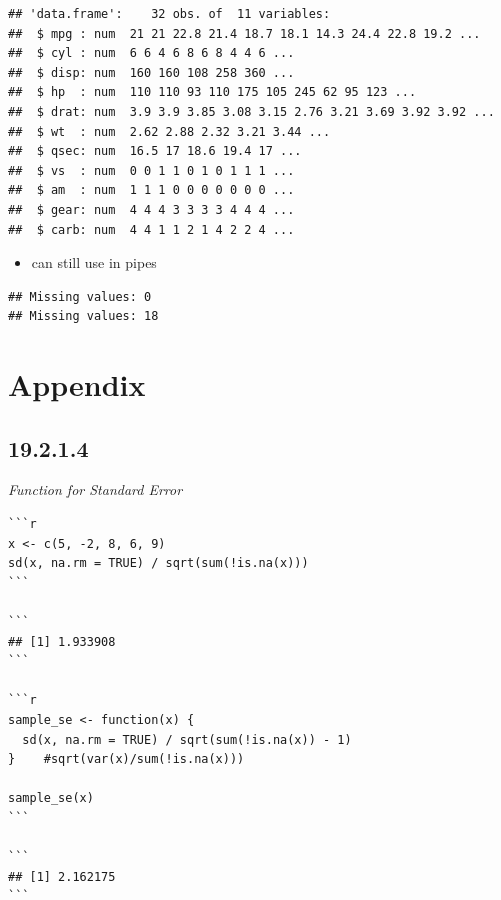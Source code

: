 \documentclass[]{book}
\newenvironment{Shaded}{\begin{snugshade}}{\end{snugshade}}
\newcommand{\DataTypeTok}[1]{\textcolor[rgb]{0.13,0.29,0.53}{#1}}
\newcommand{\DecValTok}[1]{\textcolor[rgb]{0.00,0.00,0.81}{#1}}
\newcommand{\KeywordTok}[1]{\textcolor[rgb]{0.13,0.29,0.53}{\textbf{#1}}}
\newcommand{\NormalTok}[1]{#1}
\newcommand{\OperatorTok}[1]{\textcolor[rgb]{0.81,0.36,0.00}{\textbf{#1}}}
\newcommand{\OtherTok}[1]{\textcolor[rgb]{0.56,0.35,0.01}{#1}}
\newcommand{\StringTok}[1]{\textcolor[rgb]{0.31,0.60,0.02}{#1}}
\providecommand{\tightlist}{%
  \setlength{\itemsep}{0pt}\setlength{\parskip}{0pt}}
\theoremstyle{definition}
\theoremstyle{definition}
\theoremstyle{definition}
\theoremstyle{remark}
\begin{document}
\begin{verbatim}
## 'data.frame':    32 obs. of  11 variables:
##  $ mpg : num  21 21 22.8 21.4 18.7 18.1 14.3 24.4 22.8 19.2 ...
##  $ cyl : num  6 6 4 6 8 6 8 4 4 6 ...
##  $ disp: num  160 160 108 258 360 ...
##  $ hp  : num  110 110 93 110 175 105 245 62 95 123 ...
##  $ drat: num  3.9 3.9 3.85 3.08 3.15 2.76 3.21 3.69 3.92 3.92 ...
##  $ wt  : num  2.62 2.88 2.32 3.21 3.44 ...
##  $ qsec: num  16.5 17 18.6 19.4 17 ...
##  $ vs  : num  0 0 1 1 0 1 0 1 1 1 ...
##  $ am  : num  1 1 1 0 0 0 0 0 0 0 ...
##  $ gear: num  4 4 4 3 3 3 3 4 4 4 ...
##  $ carb: num  4 4 1 1 2 1 4 2 2 4 ...
\end{verbatim}

\begin{itemize}
\tightlist
\item
  can still use in pipes
\end{itemize}

\begin{Shaded}
\end{Shaded}

\begin{verbatim}
## Missing values: 0
## Missing values: 18
\end{verbatim}

\hypertarget{appendix-5}{%
\chapter{Appendix}\label{appendix-5}}

\hypertarget{section-66}{%
\section{19.2.1.4}\label{section-66}}

\emph{Function for Standard Error}

\begin{verbatim}
```r
x <- c(5, -2, 8, 6, 9)
sd(x, na.rm = TRUE) / sqrt(sum(!is.na(x)))
```

```
## [1] 1.933908
```

```r
sample_se <- function(x) {
  sd(x, na.rm = TRUE) / sqrt(sum(!is.na(x)) - 1)
}    #sqrt(var(x)/sum(!is.na(x)))

sample_se(x)
```

```
## [1] 2.162175
```
\end{verbatim}
\end{document}
